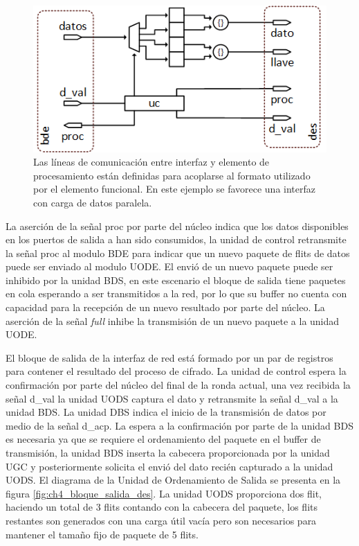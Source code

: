 \begin{figure}
	\begin{center}
		\includegraphics[scale=0.9]{figures/ch4_bloque_entrada_des.png}
	\end{center}
	\caption
		{	
			Las líneas de comunicación entre interfaz y elemento de procesamiento están definidas para acoplarse al formato utilizado por el elemento funcional. En este ejemplo se favorece una interfaz con carga de datos paralela.
		}
	\label{fig:ch4_bloque_entrada_des}
\end{figure}

La aserción de la señal proc por parte del núcleo indica que los datos disponibles en los puertos de salida a han sido consumidos, la unidad de control retransmite la señal proc al modulo BDE para indicar que un nuevo paquete de flits de datos puede ser enviado al modulo UODE. El envió de un nuevo paquete puede ser inhibido por la unidad BDS, en este escenario el bloque de salida tiene paquetes en cola esperando a ser transmitidos a la red, por lo que su buffer no cuenta con capacidad para la recepción de un nuevo resultado por parte del núcleo. La aserción de la señal \textit{full} inhibe la transmisión de un nuevo paquete a la unidad UODE.

El bloque de salida de la interfaz de red está formado por un par de registros para contener el resultado del proceso de cifrado. La unidad de control espera la confirmación por parte del núcleo del final de la ronda actual, una vez recibida la señal d\_val la unidad UODS captura el dato y retransmite la señal d\_val a la unidad BDS. La unidad DBS indica el inicio de la transmisión de datos por medio de la señal d\_acp. La espera a la confirmación por parte de la unidad BDS es necesaria ya que se requiere el ordenamiento del paquete en el buffer de transmisión, la unidad BDS inserta la cabecera proporcionada por la unidad UGC y posteriormente solicita el envió del dato recién capturado a la unidad UODS. El diagrama de la Unidad de Ordenamiento de Salida se presenta en la figura \ref{fig:ch4_bloque_salida_des}. La unidad UODS proporciona dos flit, haciendo un total de 3 flits contando con la cabecera del paquete, los flits restantes son generados con una carga útil vacía pero son necesarios para mantener el tamaño fijo de paquete de 5 flits.

